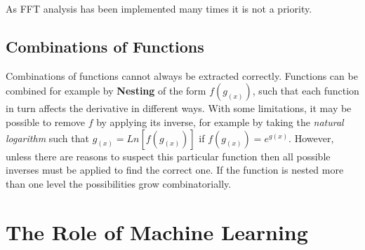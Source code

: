 \documentclass[main.tex]{subfiles}
\begin{document}
    As FFT analysis has been implemented many times it is not a priority.
    
    \subsection{Combinations of Functions}
    \label{sec:back:combFunc}
    
    Combinations of functions cannot always be extracted correctly. Functions can be combined for example by \textbf{Nesting} of the form $f(g_{(x)})$, such that each function in turn affects the derivative in different ways. With some limitations, it may be possible to remove $f$ by applying its inverse, for example by taking the \textit{natural logarithm} such that $g_{(x)}=Ln\left [ f(g_{(x)})\right ]$ if $f(g_{(x)}) = e^{g(x)}$. However, unless there are reasons to suspect this particular function then all possible inverses must be applied to find the correct one. If the function is nested more than one level the possibilities grow combinatorially. 
    
  
  \section{The Role of Machine Learning}
    
\end{document}

